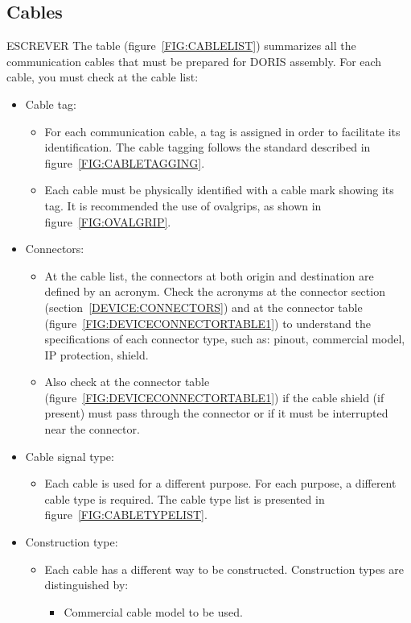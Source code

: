 \subsection{Cables} \label{DEVICE:CABLES}
ESCREVER
The table (figure~\ref{FIG:CABLELIST}) summarizes all the communication cables that must be prepared for DORIS assembly. For each cable, you must check at the cable list:
\begin{itemize}
  \item Cable tag:
  \begin{itemize}
    \item For each communication cable, a tag is assigned in order to facilitate its identification. The cable tagging follows the standard described in figure~\ref{FIG:CABLETAGGING}.
    \item Each cable must be physically identified with a cable mark showing its tag. It is recommended the use of ovalgrips, as shown in figure~\ref{FIG:OVALGRIP}.
  \end{itemize}
  \item Connectors:
  \begin{itemize}
    \item At the cable list, the connectors at both origin and destination are defined by an acronym. Check the acronyms at the connector section (section~\ref{DEVICE:CONNECTORS}) and at the connector table (figure~\ref{FIG:DEVICECONNECTORTABLE1}) to understand the specifications of each connector type, such as: pinout, commercial model, IP protection, shield.
    \item Also check at the connector table (figure~\ref{FIG:DEVICECONNECTORTABLE1}) if the cable shield (if present) must pass through the connector or if it must be interrupted near the connector.
  \end{itemize}
  \item Cable signal type:
  \begin{itemize}
    \item Each cable is used for a different purpose. For each purpose, a different cable type is required. The cable type list is presented in figure~\ref{FIG:CABLETYPELIST}.
  \end{itemize}
  \item Construction type:
  \begin{itemize}
    \item Each cable has a different way to be constructed. Construction types are distinguished by:
    \begin{itemize}
      \item Commercial cable model to be used.

\end{itemize}
\end{itemize}
\end{itemize}
